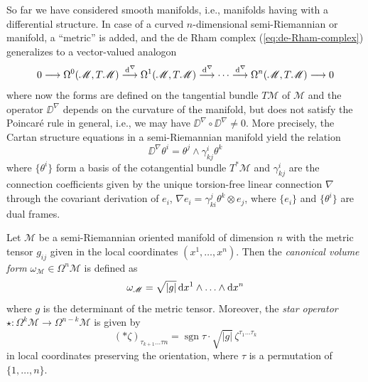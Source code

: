 	So far we have considered smooth manifolds, i.e., manifolds having with a differential structure.
	In case of a curved $n$-dimensional semi-Riemannian or manifold, a “metric” is added, and the de Rham complex (\ref{eq:de-Rham-complex}) generalizes to a vector-valued analogon
	\begin{equation}
		0 \longrightarrow
		\Omega^0 (\mathscr{M}, T\mathscr{M}) \stackrel{\,\mathrm{d}^\nabla}{\longrightarrow}
		\Omega^1 (\mathscr{M}, T\mathscr{M}) \stackrel{\,\mathrm{d}^\nabla}{\longrightarrow}
		\cdots
		\stackrel{\,\mathrm{d}^\nabla}{\longrightarrow}
		\Omega^{n} (\mathscr{M}, T\mathscr{M}) 
		\longrightarrow 
		0
		\label{eq:de-Rham-complex-curved-manifolds}
	\end{equation}
	where now the forms are defined on the tangential bundle $T\mathscr{M}$ of $\mathscr{M}$ and the 
	operator $\DD^\nabla$ depends on the curvature of the manifold, but does not satisfy the Poincar\'e rule in general, i.e., we may have $\DD^\nabla \circ \DD^\nabla \ne 0$.
	\cite[252]{Jaenich-2002}
	More precisely, the Cartan structure equations in a semi-Riemannian manifold yield the relation
	\begin{equation}
		\DD^\nabla \theta^i 
		= \theta^j \wedge \gamma^i_{kj} \theta^k
	\end{equation}
	where $\{\theta^i\}$ form a basis of the cotangential bundle $T^*\mathscr{M}$ %
	and $\gamma^i_{kj}$ are the connection coefficients given by the unique torsion-free linear connection $\nabla$ through the covariant derivation of $e_i$, $\nabla e_i = \gamma^j_{ki} \theta^k \otimes e_j$, where $\{e_i\}$ and $\{\theta^i\}$ are dual frames.
	\cite[301,310]{Choquet-Bruhat-et-al-1982}

\begin{definition}
	Let $\mathscr{M}$ be a semi-Riemannian oriented manifold of dimension $n$ with the metric tensor $g_{ij}$ given in the local coordinates $(x^1, \ldots, x^n)$.
	Then the \emph{canonical volume form} $\omega_\mathscr{M} \in \Omega^n \mathscr{M}$ is defined as
	\begin{equation}
		\omega_\mathscr{M} = \sqrt{|g|} \,\mathrm{d} x^1 \wedge \ldots \wedge \mathrm{d} x^n
		\label{eq:semi-Riemannian-volume-form}
	\end{equation}
	where $g$ is the determinant of the metric tensor.
	Moreover, the \emph{star operator} $\star : \Omega^k \mathscr{M} \to \Omega^{n-k} \mathscr{M}$ is given by
	\begin{equation}
		(*\zeta)_{\tau_{k+1} \ldots \tau{n}}
		= \operatorname{sgn} \tau \cdot \sqrt{|g|} \, \zeta^{\tau_1 \ldots \tau_k}
		\label{eq:semi-Riemannian-star-operator}
	\end{equation}
	in local coordinates preserving the orientation, where $\tau$ is a permutation of $\{1, \ldots, n\}$.
	\cite[253-254]{Jaenich-1992}
\end{definition}

